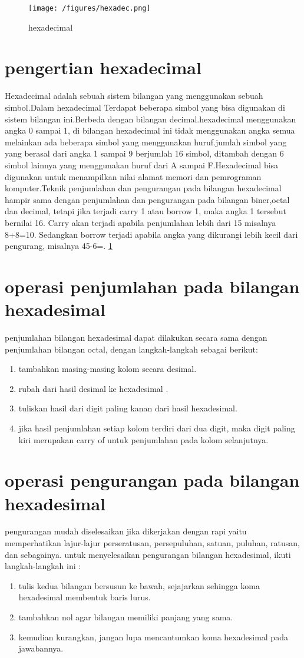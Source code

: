 \begin{figure}[ht]
\centerline{\texttt{[image: /figures/hexadec.png]}}
\caption{hexadecimal}
\label{hexadec}
\end{figure}

\section{pengertian hexadecimal}
	Hexadecimal adalah sebuah sistem bilangan yang menggunakan sebuah simbol.Dalam hexadecimal Terdapat beberapa simbol yang bisa digunakan di sistem bilangan ini.Berbeda dengan bilangan decimal.hexadecimal menggunakan angka 0 sampai 1, di bilangan hexadecimal ini tidak menggunakan angka semua melainkan ada beberapa simbol yang menggunakan huruf.jumlah simbol yang yang berasal dari angka 1 sampai 9 berjumlah 16 simbol, ditambah dengan 6 simbol lainnya yang menggunakan huruf dari A sampai F.Hexadecimal bisa digunakan untuk menampilkan nilai alamat memori dan pemrograman komputer.Teknik penjumlahan dan pengurangan pada bilangan hexadecimal hampir sama dengan penjumlahan dan pengurangan pada bilangan biner,octal dan decimal, tetapi jika terjadi carry 1 atau borrow 1, maka angka 1 tersebut bernilai 16. Carry akan terjadi apabila penjumlahan lebih dari 15 misalnya 8+8=10. Sedangkan borrow terjadi apabila angka yang dikurangi lebih kecil dari pengurang, misalnya 45-6=. \ref{hexadec}
	\cite {schwarz1997implementation}
\section{operasi penjumlahan pada bilangan hexadesimal}
penjumlahan bilangan hexadesimal dapat dilakukan secara sama dengan penjumlahan bilangan octal, dengan langkah-langkah sebagai berikut: \begin{enumerate}
			\item tambahkan masing-masing kolom secara desimal. 
			\item rubah dari hasil desimal ke hexadesimal .
			\item tuliskan hasil dari digit paling kanan dari hasil hexadesimal. 
			\item jika hasil penjumlahan setiap kolom terdiri dari dua digit, maka digit paling kiri merupakan carry of untuk penjumlahan pada kolom selanjutnya.
			\end{enumerate}
\section{operasi pengurangan pada bilangan hexadesimal}
pengurangan mudah diselesaikan jika dikerjakan dengan rapi yaitu memperhatikan lajur-lajur perseratusan, persepuluhan, satuan, puluhan, ratusan, dan sebagainya. untuk menyelesaikan pengurangan bilangan hexadesimal, ikuti langkah-langkah ini :
	\begin{enumerate}
		\item tulis kedua bilangan bersusun ke bawah, sejajarkan sehingga koma hexadesimal membentuk baris lurus.
		\item tambahkan nol agar bilangan memiliki panjang yang sama.
		\item kemudian kurangkan, jangan lupa mencantumkan koma hexadesimal pada jawabannya.
	\end{enumerate}

